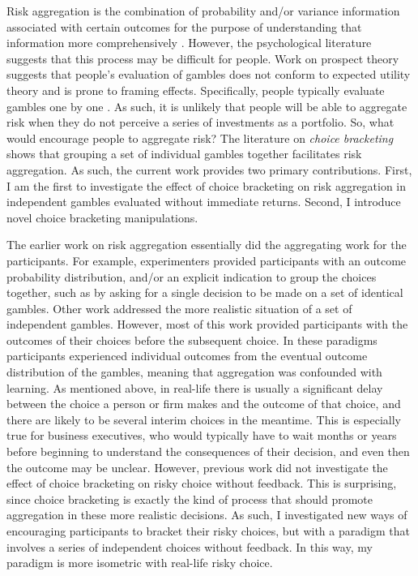 \documentclass[a4paper, nobind, dvipsnames]{templates/ociamthesis}
\theoremstyle{definition}
\theoremstyle{definition}
\theoremstyle{definition}
\theoremstyle{definition}
\theoremstyle{remark}
\begin{document}
Risk aggregation is the combination of probability and/or variance information
associated with certain outcomes for the purpose of understanding that
information more comprehensively \autocite{bjornsen2019}. However, the psychological
literature suggests that this process may be difficult for people. Work on
prospect theory \autocite{kahneman1979} suggests that people's evaluation of gambles
does not conform to expected utility theory and is prone to framing effects.
Specifically, people typically evaluate gambles one by one \autocite{rabin2009,tversky1981,kahneman1993}. As such, it is unlikely that people will be able
to aggregate risk when they do not perceive a series of investments as a
portfolio. So, what would encourage people to aggregate risk? The literature on
\emph{choice bracketing} \autocite{read1999} shows that grouping a set of individual gambles
together facilitates risk aggregation. As such, the current work provides two
primary contributions. First, I am the first to investigate the effect of choice
bracketing on risk aggregation in independent gambles evaluated without
immediate returns. Second, I introduce novel choice bracketing manipulations.

The earlier work on risk aggregation essentially did the aggregating work for
the participants. For example, experimenters provided participants with an
outcome probability distribution, and/or an explicit indication to group the
choices together, such as by asking for a single decision to be made on a set of
identical gambles. Other work addressed the more realistic situation of a set of
independent gambles. However, most of this work provided participants with the
outcomes of their choices before the subsequent choice. In these paradigms
participants experienced individual outcomes from the eventual outcome
distribution of the gambles, meaning that aggregation was confounded with
learning. As mentioned above, in real-life there is usually a significant delay
between the choice a person or firm makes and the outcome of that choice, and
there are likely to be several interim choices in the meantime. This is
especially true for business executives, who would typically have to wait months
or years before beginning to understand the consequences of their decision, and
even then the outcome may be unclear. However, previous work did not investigate
the effect of choice bracketing on risky choice without feedback. This is
surprising, since choice bracketing is exactly the kind of process that should
promote aggregation in these more realistic decisions. As such, I investigated
new ways of encouraging participants to bracket their risky choices, but with a
paradigm that involves a series of independent choices without feedback. In this
way, my paradigm is more isometric with real-life risky choice.
\end{document}
